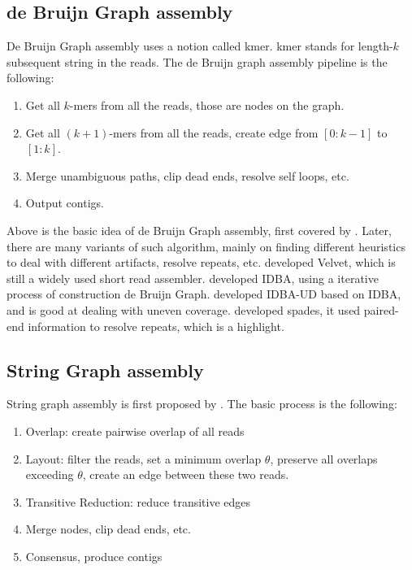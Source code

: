 \documentclass{bioinfo}
\begin{document}
\subsection{de Bruijn Graph assembly}

De Bruijn Graph assembly uses a notion called kmer. kmer stands for length-$k$ subsequent string in the reads. The de Bruijn graph assembly pipeline is the following: 
\begin{enumerate}
	\item Get all $k$-mers from all the reads, those are nodes on the graph.
	\item Get all $(k+1)$-mers from all the reads, create edge from $[0:k-1]$ to $[1:k]$.
	\item Merge unambiguous paths, clip dead ends, resolve self loops, etc.
	\item Output contigs. 
\end{enumerate}

Above is the basic idea of de Bruijn Graph assembly, first covered by \cite{pevzner2001eulerian}. Later, there are many variants of such algorithm, mainly on finding different heuristics to deal with different artifacts, resolve repeats, etc. \cite{zerbino2008velvet} developed Velvet, which is still a widely used short read assembler. \cite{peng2010idba} developed IDBA, using a iterative process of construction de Bruijn Graph. \cite{peng2012idba} developed IDBA-UD based on IDBA, and is good at dealing with uneven coverage. \cite{bankevich2012spades} developed spades, it used paired-end information to resolve repeats, which is a highlight. 


\subsection{String Graph assembly}

String graph assembly is first proposed by \cite{myers2005fragment}. The basic process is the following:

\begin{enumerate}
	\item Overlap: create pairwise overlap of all reads
	\item Layout: filter the reads, set a minimum overlap $\theta$, preserve all overlaps exceeding $\theta$, create an edge between these two reads.
	\item Transitive Reduction: reduce transitive edges
	\item Merge nodes, clip dead ends, etc.
	\item Consensus, produce contigs
\end{enumerate}
\end{document}
